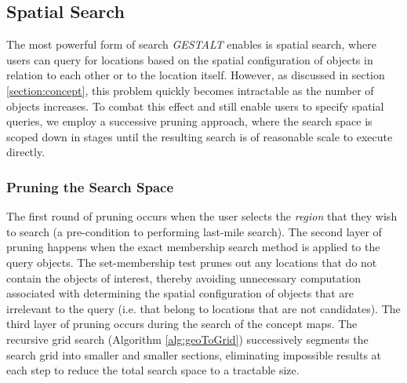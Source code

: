 



        


\subsection{Spatial Search}

The most powerful form of search \emph{GESTALT} enables is spatial search, where users can query for locations based on the spatial configuration of objects in relation to each other or to the location itself.
However, as discussed in section \ref{section:concept}, this problem quickly becomes intractable as the number of objects increases.
To combat this effect and still enable users to specify spatial queries, we employ a successive pruning approach, where the search space is scoped down in stages until the resulting search is of reasonable scale to execute directly.

\subsubsection{Pruning the Search Space}
The first round of pruning occurs when the user selects the \emph{region} that they wish to search (a pre-condition to performing last-mile search). 
The second layer of pruning happens when the exact membership search method is applied to the query objects.
The set-membership test prunes out any locations that do not contain the objects of interest, thereby avoiding unnecessary computation associated with determining the spatial configuration of objects that are irrelevant to the query (i.e. that belong to locations that are not candidates).
The third layer of pruning occurs during the search of the concept maps. 
The recursive grid search (Algorithm \ref{alg:geoToGrid}) successively segments the search grid into smaller and smaller sections, eliminating impossible results at each step to reduce the total search space to a tractable size.

